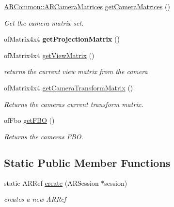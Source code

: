 \begin{DoxyCompactItemize}
\hyperlink{struct_a_r_common_1_1_a_r_camera_matrices}{A\+R\+Common\+::\+A\+R\+Camera\+Matrices} \hyperlink{class_a_r_processor_a82a9b334360ebccd844e7cf5584eff8b}{get\+Camera\+Matrices} ()
\begin{DoxyCompactList}\small\item\em Get the camera matrix set. \end{DoxyCompactList}\item 
\mbox{\label{class_a_r_processor_a0f7cf764c73a8fc3964be088156766ea}} 
of\+Matrix4x4 {\bfseries get\+Projection\+Matrix} ()
\item 
\mbox{\label{class_a_r_processor_a2e1d4cde9029bad28ac797c94e73096a}} 
of\+Matrix4x4 \hyperlink{class_a_r_processor_a2e1d4cde9029bad28ac797c94e73096a}{get\+View\+Matrix} ()
\begin{DoxyCompactList}\small\item\em returns the current view matrix from the camera \end{DoxyCompactList}\item 
\mbox{\label{class_a_r_processor_aea093b6d054daa0c75de6f7a492a19ff}} 
of\+Matrix4x4 \hyperlink{class_a_r_processor_aea093b6d054daa0c75de6f7a492a19ff}{get\+Camera\+Transform\+Matrix} ()
\begin{DoxyCompactList}\small\item\em Returns the camera\textquotesingle{}s current transform matrix. \end{DoxyCompactList}\item 
\mbox{\label{class_a_r_processor_a8436dc786e91fb933879d90a4ab396d5}} 
of\+Fbo \hyperlink{class_a_r_processor_a8436dc786e91fb933879d90a4ab396d5}{get\+F\+BO} ()
\begin{DoxyCompactList}\small\item\em Returns the camera\textquotesingle{}s F\+BO. \end{DoxyCompactList}\end{DoxyCompactItemize}
\subsection*{Static Public Member Functions}
\begin{DoxyCompactItemize}
\item 
\mbox{\label{class_a_r_processor_affa1cf36e94e3015c436fd30626dd773}} 
static A\+R\+Ref \hyperlink{class_a_r_processor_affa1cf36e94e3015c436fd30626dd773}{create} (A\+R\+Session $\ast$session)
\begin{DoxyCompactList}\small\item\em creates a new A\+R\+Ref \end{DoxyCompactList}\end{DoxyCompactItemize}
